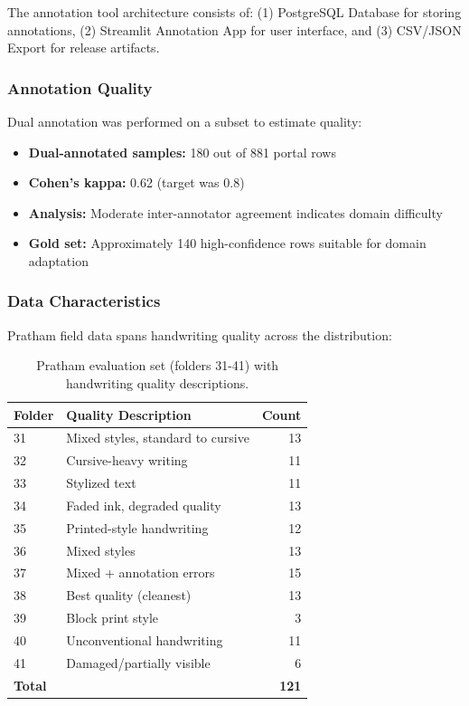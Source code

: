 \documentclass[14pt,a4paper]{article}
\begin{document}
The annotation tool architecture consists of: (1) PostgreSQL Database for storing annotations, (2) Streamlit Annotation App for user interface, and (3) CSV/JSON Export for release artifacts.

\subsubsection{Annotation Quality}

Dual annotation was performed on a subset to estimate quality:
\begin{itemize}
    \item \textbf{Dual-annotated samples:} 180 out of 881 portal rows
    \item \textbf{Cohen's kappa:} 0.62 (target was 0.8)
    \item \textbf{Analysis:} Moderate inter-annotator agreement indicates domain difficulty
    \item \textbf{Gold set:} Approximately 140 high-confidence rows suitable for domain adaptation
\end{itemize}

\subsubsection{Data Characteristics}

Pratham field data spans handwriting quality across the distribution:

\begin{table}[h]
    \centering
    \begin{tabular}{llr}
        \toprule
        \textbf{Folder} & \textbf{Quality Description} & \textbf{Count} \\
        \midrule
        31 & Mixed styles, standard to cursive & 13 \\
        32 & Cursive-heavy writing & 11 \\
        33 & Stylized text & 11 \\
        34 & Faded ink, degraded quality & 13 \\
        35 & Printed-style handwriting & 12 \\
        36 & Mixed styles & 13 \\
        37 & Mixed + annotation errors & 15 \\
        38 & Best quality (cleanest) & 13 \\
        39 & Block print style & 3 \\
        40 & Unconventional handwriting & 11 \\
        41 & Damaged/partially visible & 6 \\
        \textbf{Total} & & \textbf{121} \\
        \bottomrule
    \end{tabular}
    \caption{Pratham evaluation set (folders 31-41) with handwriting quality descriptions.}
\end{table}
\end{document}

